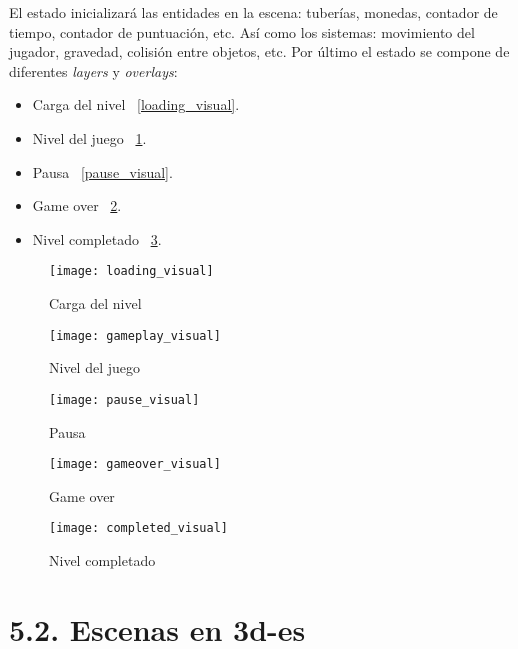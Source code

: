 El estado inicializará las entidades en la escena: tuberías, monedas, contador de tiempo, 
contador de puntuación, etc. Así como los sistemas: movimiento del jugador, gravedad,
colisión entre objetos, etc.
Por último el estado se compone de diferentes \textit{layers} y \textit{overlays}:
\begin{itemize}
    \item Carga del nivel \figurename~\ref{loading_visual}.
    \item Nivel del juego \figurename~\ref{gameplay_visual}.
    \item Pausa \figurename~\ref{pause_visual}.
    \item Game over \figurename~\ref{gameover_visual}.
    \item Nivel completado \figurename~\ref{completed_visual}.
\end{itemize}
\begin{figure}[h!]
    \centering
    \begin{minipage}[c]{.5\textwidth}
        \texttt{[image: loading\_visual]}
        \caption{Carga del nivel}
        \label{loading_visual}
    \end{minipage}%
    \begin{minipage}[c]{.5\textwidth}
        \texttt{[image: gameplay\_visual]}
        \caption{Nivel del juego}
        \label{gameplay_visual}
    \end{minipage}%
\end{figure}
\begin{figure}[h!]
    \centering
    \begin{minipage}[c]{.5\textwidth}
        \texttt{[image: pause\_visual]}
        \caption{Pausa}
        \label{pause_visual}
    \end{minipage}%
    \begin{minipage}[c]{.5\textwidth}
        \texttt{[image: gameover\_visual]}
        \caption{Game over}
        \label{gameover_visual}
    \end{minipage}%
\end{figure}
\begin{figure}[h!]
    \centering
    \texttt{[image: completed\_visual]}
    \caption{Nivel completado}
    \label{completed_visual}
\end{figure}

\section*{5.2. Escenas en \gls{3d-es}}\label{sec:3d_scenes}

